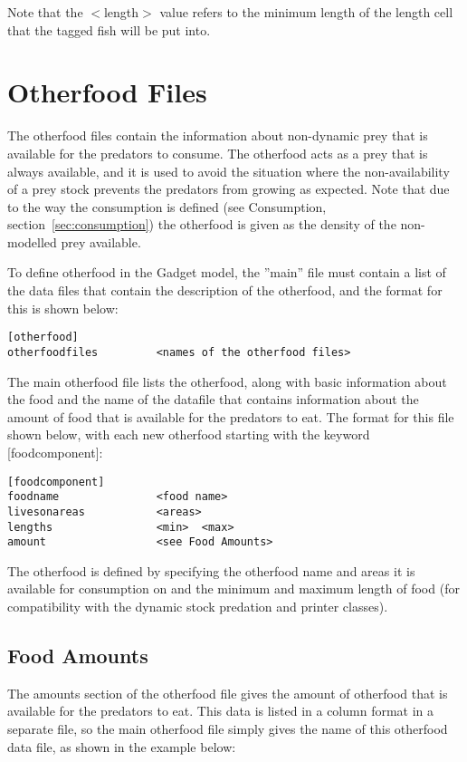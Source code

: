 \documentclass [a4paper, 10pt]{book}
\begin{document}
Note that the $<$length$>$ value refers to the minimum length of the length cell that the tagged fish will be put into.

\chapter{Otherfood Files}\label{chap:other}
The otherfood files contain the information about non-dynamic prey that is available for the predators to consume.  The otherfood acts as a prey that is always available, and it is used to avoid the situation where the non-availability of a prey stock prevents the predators from growing as expected.  Note that due to the way the consumption is defined (see Consumption, section~\ref{sec:consumption}) the otherfood is given as the density of the non-modelled prey available.

\bigskip
To define otherfood in the Gadget model, the ''main'' file must contain a list of the data files that contain the description of the otherfood, and the format for this is shown below:

{\small\begin{verbatim}
[otherfood]
otherfoodfiles         <names of the otherfood files>
\end{verbatim}}

The main otherfood file lists the otherfood, along with basic information about the food and the name of the datafile that contains information about the amount of food that is available for the predators to eat.  The format for this file shown below, with each new otherfood starting with the keyword [foodcomponent]:

{\small\begin{verbatim}
[foodcomponent]
foodname               <food name>
livesonareas           <areas>
lengths                <min>  <max>
amount                 <see Food Amounts>
\end{verbatim}}

The otherfood is defined by specifying the otherfood name and areas it is available for consumption on and the minimum and maximum length of food (for compatibility with the dynamic stock predation and printer classes).

\newpage %
\section{Food Amounts}\label{sec:foodamounts}
The amounts section of the otherfood file gives the amount of otherfood that is available for the predators to eat.  This data is listed in a column format in a separate file, so the main otherfood file simply gives the name of this otherfood data file, as shown in the example below:
\end{document}
